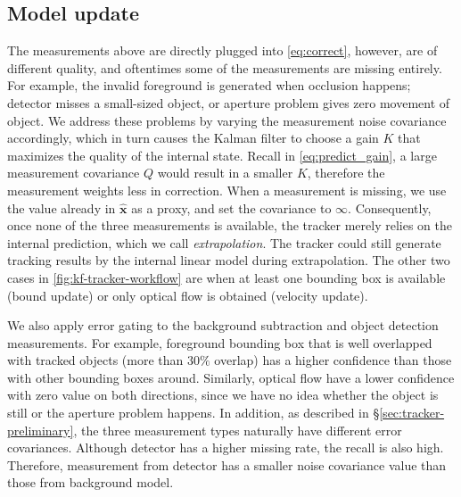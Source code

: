\subsection{Model update}

The measurements above are directly plugged into \ref{eq:correct}, however, are of different quality, and oftentimes some of the measurements are missing entirely. For example, the invalid foreground is generated when occlusion happens; detector misses a small-sized object, or aperture problem gives zero movement of object.
We address these problems by varying the measurement noise covariance accordingly, which in turn causes the Kalman filter to choose a gain $K$ that maximizes the quality of the internal state. Recall in \ref{eq:predict_gain}, a large measurement covariance $Q$ would result in a smaller $K$, therefore the measurement weights less in correction. When a measurement is missing, we use the value already in $\mathbf{\hat x}$ as a proxy, and set the covariance to $\infty$. Consequently, once none of the three measurements is available, the tracker merely relies on the internal prediction, which we call \emph{extrapolation}. The tracker could still generate tracking results by the internal linear model during extrapolation. The other two cases in \ref{fig:kf-tracker-workflow} are when at least one bounding box is available (bound update) or only optical flow is obtained (velocity update).

We also apply error gating to the background subtraction and object detection measurements. %
For example, foreground bounding box that is well overlapped with tracked objects (more than $30\%$ overlap) has a higher confidence than those with other bounding boxes around. Similarly, optical flow have a lower confidence with zero value on both directions, since we have no idea whether the object is still or the aperture problem happens.
In addition, as described in \S\ref{sec:tracker-preliminary}, the three measurement types naturally have different error covariances. Although detector has a higher missing rate, the recall is also high. Therefore, measurement from detector has a smaller noise covariance value than those from background model.

